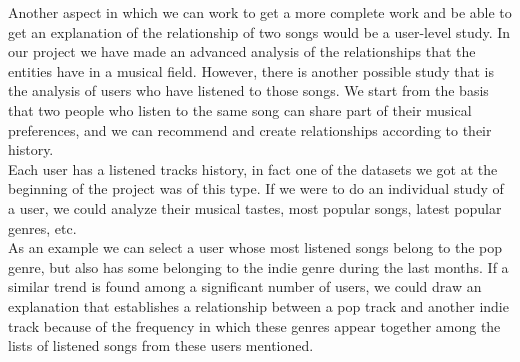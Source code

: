 Another aspect in which we can work to get a more complete work and be able to get an explanation of the relationship of two songs would be a user-level study. In our project we have made an advanced analysis of the relationships that the entities have in a musical field. However, there is another possible study that is the analysis of users who have listened to those songs. We start from the basis that two people who listen to the same song can share part of their musical preferences, and we can recommend and create relationships according to their history.\\

Each user has a listened tracks history, in fact one of the datasets we got at the beginning of the project was of this type. If we were to do an individual study of a user, we could analyze their musical tastes, most popular songs, latest popular genres, etc.\\

As an example we can select a user whose most listened songs belong to the pop genre, but also has some belonging to the indie genre during the last months. If a similar trend is found among a significant number of users, we could draw an explanation that establishes a relationship between a pop track and another indie track because of the frequency in which these genres appear together among the lists of listened songs from these users mentioned.\\